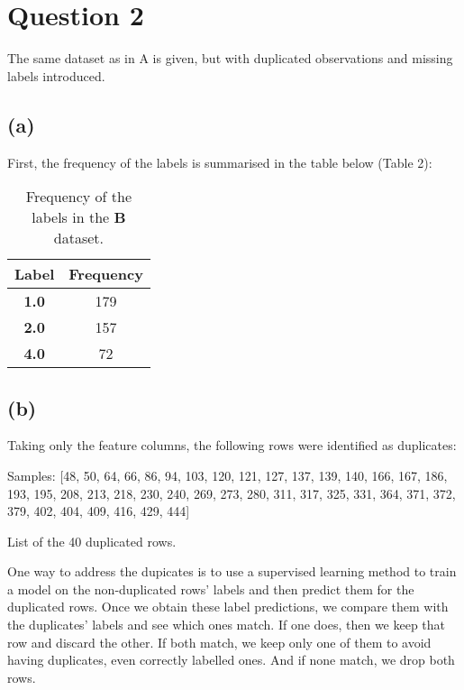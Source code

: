 \documentclass[12pt]{report} %
\begin{document}
\section*{Question 2}

The same dataset as in A is given, but with duplicated observations and missing labels introduced.

\subsection*{(a)}

First, the frequency of the labels is summarised in the table below (Table 2):

\begin{table}[h]
\centering
\begin{tabular}{ |c|c| }
    \hline
    \textbf{Label} & \textbf{Frequency} \\
    \hline
    \textbf{1.0} & 179 \\ 
    \hline
    \textbf{2.0} & 157 \\
    \hline
    \textbf{4.0} & 72 \\
    \hline
\end{tabular}
\caption{Frequency of the labels in the \textbf{B} dataset.}
\end{table}

\subsection*{(b)}

Taking only the feature columns, the following rows were identified as duplicates:

\begin{table}[h]
\centering
Samples: [48, 50, 64, 66, 86, 94, 103, 120, 121, 127, 137, 139, 140, 166, 167, 186, 193, 195,
208, 213, 218, 230, 240, 269, 273, 280, 311, 317, 325, 331, 364, 371, 372, 379, 402, 404,
409, 416, 429, 444]

\caption{List of the 40 duplicated rows.}
\end{table}

One way to address the dupicates is to use a supervised learning method to train a model on the non-duplicated rows' labels and then predict them for the duplicated rows. Once we obtain these label predictions, we compare them with the duplicates' labels and see which ones match. If one does, then we keep that row and discard the other. If both match, we keep only one of them to avoid having duplicates, even correctly labelled ones. And if none match, we drop both rows.
\end{document}
